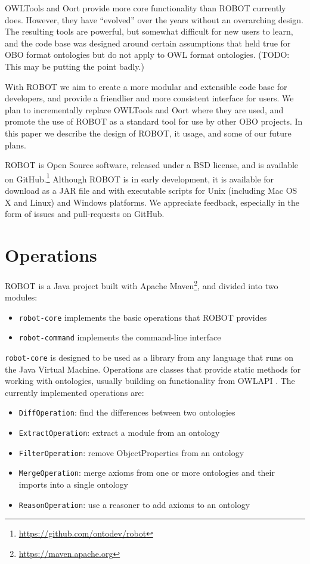 \documentclass{icbo}
\begin{document}
OWLTools and Oort provide more core functionality than ROBOT currently does. However, they have ``evolved'' over the years without an overarching design. The resulting tools are powerful, but somewhat difficult for new users to learn, and the code base was designed around certain assumptions that held true for OBO format ontologies but do not apply to OWL format ontologies. (TODO: This may be putting the point badly.)

With ROBOT we aim to create a more modular and extensible code base for developers, and provide a friendlier and more consistent interface for users.  We plan to incrementally replace OWLTools and Oort where they are used, and promote the use of ROBOT as a standard tool for use by other OBO projects. In this paper we describe the design of ROBOT, it usage, and some of our future plans.

ROBOT is Open Source software, released under a BSD license, and is available on GitHub.\footnote{\url{https://github.com/ontodev/robot}} Although ROBOT is in early development, it is available for download as a JAR file and with executable scripts for Unix (including Mac OS X and Linux) and Windows platforms. We appreciate feedback, especially in the form of issues and pull-requests on GitHub.


\section{Operations}

ROBOT is a Java project built with Apache Maven\footnote{\url{https://maven.apache.org}}, and divided into two modules:

\begin{itemize}
  \item {\tt robot-core} implements the basic operations that ROBOT provides
  \item {\tt robot-command} implements the command-line interface
\end{itemize}

{\tt robot-core} is designed to be used as a library from any language that runs on the Java Virtual Machine. Operations are classes that provide static methods for working with ontologies, usually building on functionality from OWLAPI \citep{Horridge2011}. The currently implemented operations are:

\begin{itemize}
  \item {\tt DiffOperation}: find the differences between two ontologies
  \item {\tt ExtractOperation}: extract a module from an ontology
  \item {\tt FilterOperation}: remove ObjectProperties from an ontology
  \item {\tt MergeOperation}: merge axioms from one or more ontologies and their imports into a single ontology
  \item {\tt ReasonOperation}: use a reasoner to add axioms to an ontology
\end{itemize}
\end{document}

